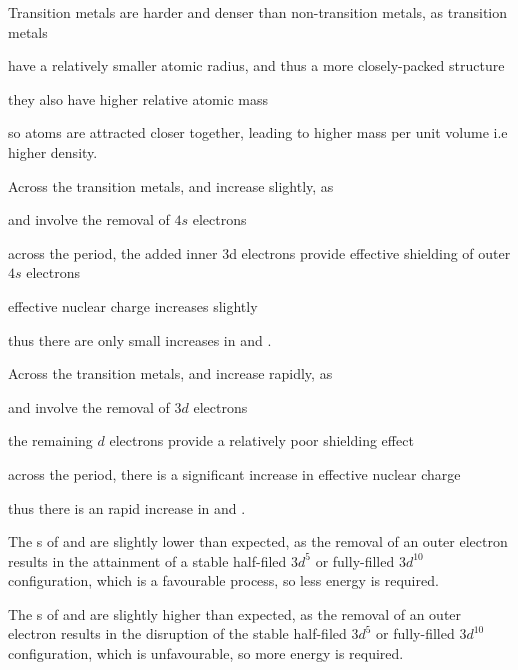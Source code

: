 \documentclass[Chemistry.tex]{subfiles}
\begin{document}
Transition metals are harder and denser than non-transition metals, as transition metals \begin{slinenum}
\item have a relatively smaller atomic radius, and thus a more closely-packed structure
\item they also have higher relative atomic mass
\item so atoms are attracted closer together, leading to higher mass per unit volume i.e higher density.
\end{slinenum}

Across the transition metals,  and  increase slightly, as \begin{slinenum}
\item {} and  involve the removal of \(4s\) electrons
\item across the period, the added inner 3d electrons provide effective shielding of outer \(4s\) electrons
\item effective nuclear charge increases slightly
\item thus there are only small increases in  and .
\end{slinenum}

Across the transition metals,  and  increase rapidly, as \begin{slinenum}
\item {} and  involve the removal of \(3d\) electrons
\item the remaining \(d\) electrons provide a relatively poor shielding effect
\item across the period, there is a significant increase in effective nuclear charge
\item thus there is an rapid increase in  and .
\end{slinenum}

The s of  and  are slightly lower than expected, as the removal of an outer electron results in the attainment of a stable half-filed \(3d^5\) or fully-filled \(3d^{10}\) configuration, which is a favourable process, so less energy is required.

The s of  and  are slightly higher than expected, as the removal of an outer electron results in the disruption of the stable half-filed \(3d^5\) or fully-filled \(3d^{10}\) configuration, which is unfavourable, so more energy is required.
\end{document}
